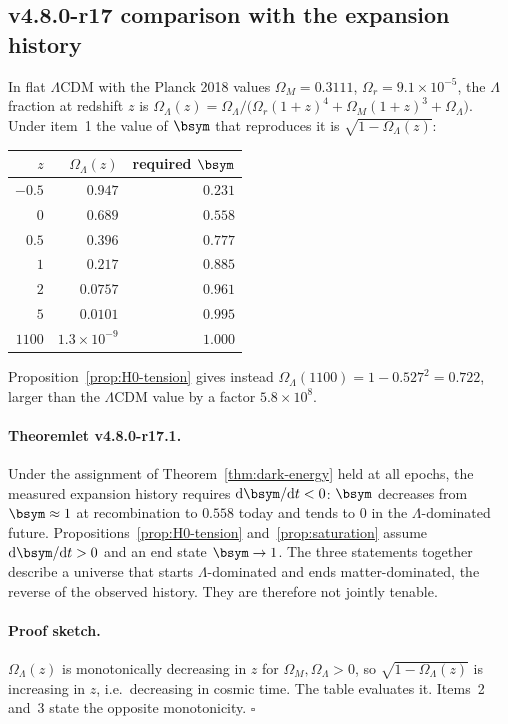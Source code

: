\subsection*{v4.8.0-r17 comparison with the expansion history}
\label{subsec:v480-r17-comparison}

In flat \(\Lambda\)CDM with the Planck 2018 values \(\Omega_M=0.3111\), \(\Omega_r=9.1\times10^{-5}\), the
\(\Lambda\) fraction at redshift \(z\) is
\(\Omega_\Lambda(z)=\Omega_\Lambda/\bigl(\Omega_r(1+z)^4+\Omega_M(1+z)^3+\Omega_\Lambda\bigr)\).  Under item~1 the
value of \(\bsym\) that reproduces it is \(\sqrt{1-\Omega_\Lambda(z)}\):
\begin{center}
\small
\begin{tabular}{@{}rrr@{}}
\toprule
\(z\) & \(\Omega_\Lambda(z)\) & required \(\bsym\)\\
\midrule
\(-0.5\) & \(0.947\) & \(0.231\)\\
\(0\) & \(0.689\) & \(0.558\)\\
\(0.5\) & \(0.396\) & \(0.777\)\\
\(1\) & \(0.217\) & \(0.885\)\\
\(2\) & \(0.0757\) & \(0.961\)\\
\(5\) & \(0.0101\) & \(0.995\)\\
\(1100\) & \(1.3\times10^{-9}\) & \(1.000\)\\
\bottomrule
\end{tabular}
\end{center}
Proposition~\ref{prop:H0-tension} gives instead \(\Omega_\Lambda(1100)=1-0.527^2=0.722\), larger than the
\(\Lambda\)CDM value by a factor \(5.8\times10^{8}\).

\paragraph{Theoremlet v4.8.0-r17.1.}
Under the assignment of Theorem~\ref{thm:dark-energy} held at all epochs, the measured expansion history requires
\(\mathrm d\bsym/\mathrm dt<0\): \(\bsym\) decreases from \(\bsym\approx1\) at recombination to \(0.558\) today and
tends to \(0\) in the \(\Lambda\)-dominated future.  Propositions~\ref{prop:H0-tension} and~\ref{prop:saturation}
assume \(\mathrm d\bsym/\mathrm dt>0\) and an end state \(\bsym\to1\).  The three statements together describe a
universe that starts \(\Lambda\)-dominated and ends matter-dominated, the reverse of the observed history.  They are
therefore not jointly tenable.

\paragraph{Proof sketch.}
\(\Omega_\Lambda(z)\) is monotonically decreasing in \(z\) for \(\Omega_M,\Omega_\Lambda>0\), so
\(\sqrt{1-\Omega_\Lambda(z)}\) is increasing in \(z\), i.e.\ decreasing in cosmic time.  The table evaluates it.
Items~2 and~3 state the opposite monotonicity.  \(\square\)

